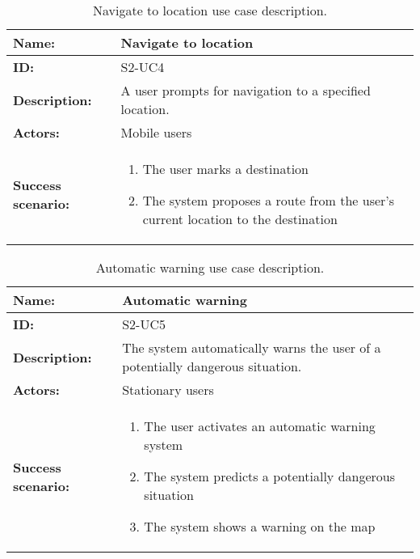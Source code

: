 \begin{table}[h!]
    \centering
    \begin{tabularx}{\textwidth}{lX}
        \toprule
        \textbf{Name:}  & Navigate to location \\ \midrule
        \textbf{ID:}    & S2-UC4 \\ \midrule
        \textbf{Description:} & A user prompts for navigation to a specified location. \\ \midrule
        \textbf{Actors:} & Mobile users \\ \midrule
        \textbf{Success scenario:} & 
        \begin{enumerate}
            \item The user marks a destination
            \item The system proposes a route from the user's current location to the destination
        \end{enumerate}
        \\ \bottomrule
    \end{tabularx}
    \caption{Navigate to location use case description.}
    \label{tab:s2-uc4}
\end{table}

\begin{table}[h!]
    \centering
    \begin{tabularx}{\textwidth}{lX}
        \toprule
        \textbf{Name:}  & Automatic warning \\ \midrule
        \textbf{ID:}    & S2-UC5 \\ \midrule
        \textbf{Description:} & The system automatically warns the user of a potentially dangerous situation. \\ \midrule
        \textbf{Actors:} & Stationary users \\ \midrule
        \textbf{Success scenario:} & 
        \begin{enumerate}
            \item The user activates an automatic warning system
            \item The system predicts a potentially dangerous situation
            \item The system shows a warning on the map
        \end{enumerate}
        \\ \bottomrule
    \end{tabularx}
    \caption{Automatic warning use case description.}
    \label{tab:s2-uc5}
\end{table}

